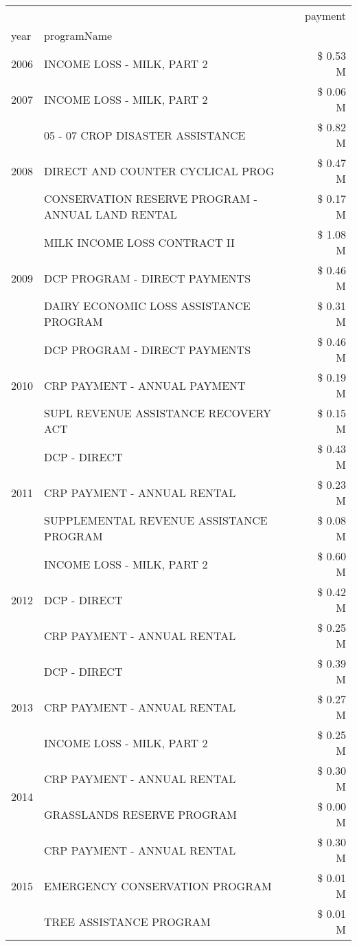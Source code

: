 \begin{tabular}{llr}
\toprule
 &  & payment \\
year & programName &  \\
\midrule
2006 & INCOME LOSS - MILK, PART 2 & \$ 0.53 M \\
\cline{1-3}
2007 & INCOME LOSS - MILK, PART 2 & \$ 0.06 M \\
\cline{1-3}
\multirow[t]{3}{*}{2008} & 05 - 07 CROP DISASTER ASSISTANCE & \$ 0.82 M \\
 & DIRECT AND COUNTER CYCLICAL PROG & \$ 0.47 M \\
 & CONSERVATION RESERVE PROGRAM - ANNUAL LAND RENTAL & \$ 0.17 M \\
\cline{1-3}
\multirow[t]{3}{*}{2009} & MILK INCOME LOSS CONTRACT II & \$ 1.08 M \\
 & DCP PROGRAM - DIRECT PAYMENTS & \$ 0.46 M \\
 & DAIRY ECONOMIC LOSS ASSISTANCE PROGRAM & \$ 0.31 M \\
\cline{1-3}
\multirow[t]{3}{*}{2010} & DCP PROGRAM - DIRECT PAYMENTS & \$ 0.46 M \\
 & CRP PAYMENT - ANNUAL PAYMENT & \$ 0.19 M \\
 & SUPL REVENUE ASSISTANCE RECOVERY ACT & \$ 0.15 M \\
\cline{1-3}
\multirow[t]{3}{*}{2011} & DCP - DIRECT & \$ 0.43 M \\
 & CRP PAYMENT - ANNUAL RENTAL & \$ 0.23 M \\
 & SUPPLEMENTAL REVENUE ASSISTANCE PROGRAM & \$ 0.08 M \\
\cline{1-3}
\multirow[t]{3}{*}{2012} & INCOME LOSS - MILK, PART 2 & \$ 0.60 M \\
 & DCP - DIRECT & \$ 0.42 M \\
 & CRP PAYMENT - ANNUAL RENTAL & \$ 0.25 M \\
\cline{1-3}
\multirow[t]{3}{*}{2013} & DCP - DIRECT & \$ 0.39 M \\
 & CRP PAYMENT - ANNUAL RENTAL & \$ 0.27 M \\
 & INCOME LOSS - MILK, PART 2 & \$ 0.25 M \\
\cline{1-3}
\multirow[t]{2}{*}{2014} & CRP PAYMENT - ANNUAL RENTAL & \$ 0.30 M \\
 & GRASSLANDS RESERVE PROGRAM & \$ 0.00 M \\
\cline{1-3}
\multirow[t]{3}{*}{2015} & CRP PAYMENT - ANNUAL RENTAL & \$ 0.30 M \\
 & EMERGENCY CONSERVATION PROGRAM & \$ 0.01 M \\
 & TREE ASSISTANCE PROGRAM & \$ 0.01 M \\

\end{tabular}
